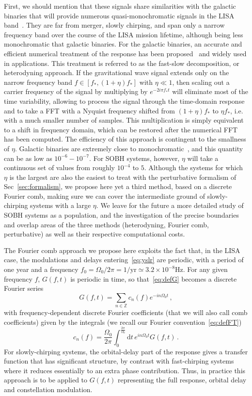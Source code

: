 \documentclass[aps,showpacs,twocolumn,
prd,superscriptaddress,nofootinbib]{revtex4-1}
\newcommand{\be}{\begin{equation}}
\newcommand{\ee}{\end{equation}}
\newcommand\ud{{\mathrm{d}}}
\begin{document}
First, we should mention that these signals share similarities with the galactic binaries that will provide numerous quasi-monochromatic signals in the LISA band~\cite{Nelemans+01, LISA17}. They are far from merger, slowly chirping, and span only a narrow frequency band over the course of the LISA mission lifetime, although being less monochromatic that galactic binaries. For the galactic binaries, an accurate and efficient numerical treatment of the response has been proposed~\cite{CL07} and widely used in applications. This treatment is referred to as the fast-slow decomposition, or heterodyning approach. If the gravitational wave signal extends only on the narrow frequency band $f \in [f_{*}, (1+\eta) f_{*}]$ with $\eta \ll 1$, then scaling out a carrier frequency of the signal by multiplying by $e^{-2 i \pi f_{*} t}$ will eliminate most of the time variability, allowing to process the signal through the time-domain response and to take a FFT with a Nyquist frequency shifted from $(1+\eta) f_{*}$ to $\eta f_{*}$, i.e. with a much smaller number of samples. This multiplication is simply equivalent to a shift in frequency domain, which can be restored after the numerical FFT has been computed. The efficiency of this approach is contingent to the smallness of $\eta$. Galactic binaries are extremely close to monochromatic~\cite{Nelemans+01}, and this quantity can be as low as $10^{-6}-10^{-7}$. For SOBH systems, however, $\eta$ will take a continuous set of values from roughly $10^{-4}$ to $5$. Although the systems for which $\eta$ is the largest are also the easiest to treat with the perturbative formalism of Sec~\ref{sec:formalism}, we propose here yet a third method, based on a discrete Fourier comb, making sure we can cover the intermediate ground of slowly-chirping systems with a large $\eta$. We leave for the future a more detailed study of SOBH systems as a population, and the investigation of the precise boundaries and overlap areas of the three methods (heterodyning, Fourier comb, perturbative) as well as their respective computational costs.

The Fourier comb approach we propose here exploits the fact that, in the LISA case, the modulations and delays entering~\eqref{eq:yslr} are periodic, with a period of one year and a frequency $f_{0} = \Omega_{0}/2\pi = 1/\mathrm{yr} \simeq 3.2\times 10^{-8}\mathrm{Hz}$. For any given frequency $f$, $G(f,t)$ is periodic in time, so that~\eqref{eq:defG} becomes a discrete Fourier series
\be\label{eq:Gdiscretefourier}
	G(f,t) = \sum_{n \in \mathbb{Z}} c_{n}(f) e^{-in\Omega_{0}t} \,,
\ee
with frequency-dependent discrete Fourier coefficients (that we will also call comb coefficients) given by the integrals (we recall our Fourier convention~\eqref{eq:defFT})
\be\label{eq:defcn}
	c_{n}(f) = \frac{\Omega_{0}}{2\pi} \int_{0}^{\frac{2\pi}{\Omega_{0}}} \ud t \, e^{i n \Omega_{0} t} G(f,t) \,.
\ee
For slowly-chirping systems, the orbital-delay part of the response gives a transfer function that has significant structure, by contrast with fast-chirping systems where it reduces essentially to an extra phase contribution. Thus, in practice this approach is to be applied to $G(f,t)$ representing the full response, orbital delay and constellation modulation.
 
\end{document}

